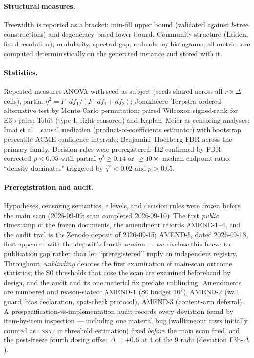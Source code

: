 \documentclass[11pt]{article}
\begin{document}
\paragraph{Structural measures.}
Treewidth is reported as a bracket: min-fill upper bound (validated against
$k$-tree constructions) and degeneracy-based lower bound. Community structure
(Leiden, fixed resolution), modularity, spectral gap, redundancy histograms;
all metrics are computed deterministically on the generated instance and
stored with it.

\paragraph{Statistics.}
Repeated-measures ANOVA with seed as subject (seeds shared across all
$r\times\Delta$ cells), partial $\eta^2 = F\cdot df_1/(F\cdot df_1+df_2)$;
Jonckheere--Terpstra ordered-alternative test by Monte Carlo permutation;
paired Wilcoxon signed-rank for E3b pairs; Tobit (type-I, right-censored) and
Kaplan--Meier as censoring analyses; Imai et al.~\cite{imai2011} causal mediation
(product-of-coefficients estimator) with bootstrap percentile ACME confidence
intervals; Benjamini--Hochberg FDR across the
primary family. Decision rules were preregistered: H2 confirmed by
FDR-corrected $p<0.05$ with partial $\eta^2 \ge 0.14$ or $\ge 10\times$
median endpoint ratio; ``density dominates'' triggered by $\eta^2<0.02$ and
$p>0.05$.

\paragraph{Preregistration and audit.}
Hypotheses, censoring semantics, $r$ levels, and decision rules were frozen
before the main scan (2026-09-09; scan completed 2026-09-10). The first
\emph{public} timestamp of the frozen documents, the amendment records
AMEND-1--4, and the audit trail is the Zenodo deposit of 2026-09-15;
AMEND-5, dated 2026-09-18, first appeared with the deposit's fourth
version --- we disclose this
freeze-to-publication gap rather than let ``preregistered'' imply an
independent registry. Throughout, \emph{unblinding} denotes the first
examination of main-scan outcome statistics; the S0 thresholds that dose the
scan are examined beforehand by design, and the audit and its one material
fix predate unblinding.
Amendments are numbered and reason-stated: AMEND-1 (S0
budget $10^7$), AMEND-2 (wall guard, bias declaration, spot-check protocol),
AMEND-3 (content-arm deferral). A prespecification-vs-implementation audit
records every deviation found by item-by-item inspection --- including one
material bug (walltimeout rows initially counted as \textsc{unsat} in
threshold estimation) fixed \emph{before} the main scan fired, and the
post-freeze fourth dosing offset $\Delta{=}{+}0.6$ at 4 of the 9 radii
(deviation E3b-$\Delta$).
\end{document}
